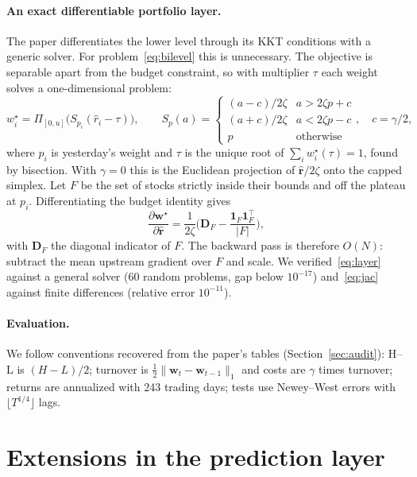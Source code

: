 \documentclass[10pt,a4paper]{article}
\newcommand{\rhat}{\hat{\bm r}}
\newcommand{\w}{\bm w}
\begin{document}
\paragraph{An exact differentiable portfolio layer.}\label{sec:layer} The paper differentiates the lower level
through its KKT conditions with a generic solver. For problem~\eqref{eq:bilevel} this is unnecessary. The
objective is separable apart from the budget constraint, so with multiplier $\tau$ each weight solves a
one-dimensional problem:
\begin{equation}
w_i^\star=\Pi_{[0,u]}\!\big(S_{p_i}(\hat r_i-\tau)\big),\qquad
S_p(a)=\begin{cases}(a-c)/2\zeta & a>2\zeta p+c\\ (a+c)/2\zeta & a<2\zeta p-c\\ p & \text{otherwise}\end{cases},\quad c=\gamma/2,
\label{eq:layer}
\end{equation}
where $p_i$ is yesterday's weight and $\tau$ is the unique root of $\sum_i w_i^\star(\tau)=1$, found by bisection.
With $\gamma=0$ this is the Euclidean projection of $\rhat/2\zeta$ onto the capped simplex. Let $F$ be the set of
stocks strictly inside their bounds and off the plateau at $p_i$. Differentiating the budget identity gives
\begin{equation}
\frac{\partial\w^\star}{\partial\rhat}=\frac{1}{2\zeta}\Big(\bm D_F-\frac{\bm 1_F\bm 1_F^\top}{|F|}\Big),
\label{eq:jac}
\end{equation}
with $\bm D_F$ the diagonal indicator of $F$. The backward pass is therefore $O(N)$: subtract the mean upstream
gradient over $F$ and scale. We verified~\eqref{eq:layer} against a general solver (60 random problems, gap below
$10^{-17}$) and~\eqref{eq:jac} against finite differences (relative error $10^{-11}$).

\paragraph{Evaluation.} We follow conventions recovered from the paper's tables (Section~\ref{sec:audit}): H--L is
$(H-L)/2$; turnover is $\tfrac12\lVert\w_t-\w_{t-1}\rVert_1$ and costs are $\gamma$ times turnover; returns are
annualized with 243 trading days; tests use Newey--West errors with $\lfloor T^{1/4}\rfloor$ lags.

\section{Extensions in the prediction layer}\label{sec:ext}
\end{document}
